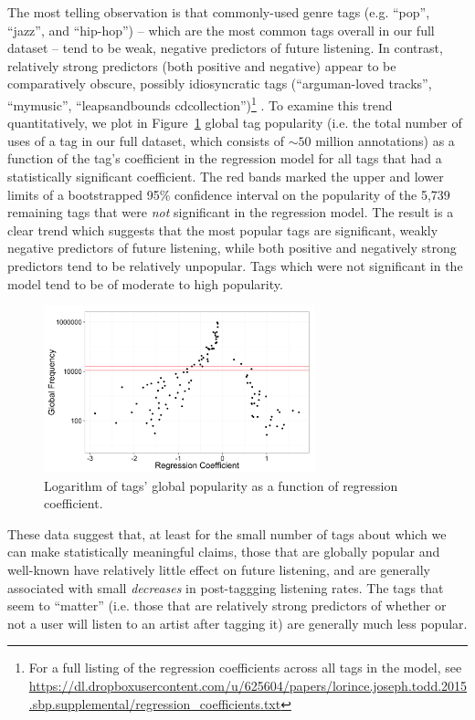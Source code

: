 The most telling observation is that commonly-used genre tags (e.g. ``pop'', ``jazz'', and ``hip-hop'') -- which are the most common tags overall in our full dataset -- tend to be weak, negative predictors of future listening. In contrast, relatively strong predictors (both positive and negative) appear to be comparatively obscure, possibly idiosyncratic tags (``arguman-loved tracks'', ``mymusic'', ``leapsandbounds cdcollection'')\footnote{For a full listing of the regression coefficients across all tags in the model, see \url{https://dl.dropboxusercontent.com/u/625604/papers/lorince.joseph.todd.2015.sbp.supplemental/regression_coefficients.txt}} . To examine this trend quantitatively, we plot in Figure~\ref{fig:coefVsPopularity} global tag popularity (i.e. the total number of uses of a tag in our full dataset, which consists of $\sim 50$ million annotations) as a function of the tag's coefficient in the regression model for all tags that had a statistically significant coefficient. The red bands marked the upper and lower limits of a bootstrapped 95\% confidence interval on the popularity of the 5,739 remaining tags that were \emph{not} significant in the regression model. The result is a clear trend which suggests that the most popular tags are significant, weakly negative predictors of future listening, while both positive and negatively strong predictors tend to be relatively unpopular. Tags which were not significant in the model tend to be of moderate to high popularity.

  \begin{figure}[t]
	\centering
      \includegraphics[width=0.7\textwidth]{scatterplotTagRegression.png}
    \caption{Logarithm of tags' global popularity as a function of regression coefficient.}
    \label{fig:coefVsPopularity}
  \end{figure}

These data suggest that, at least for the small number of tags about which we can make statistically meaningful claims, those that are globally popular and well-known have relatively little effect on future listening, and are generally associated with small \emph{decreases} in post-taggging listening rates. The tags that seem to ``matter'' (i.e. those that are relatively strong predictors of whether or not a user will listen to an artist after tagging it) are generally much less popular.